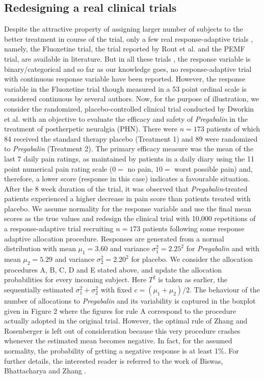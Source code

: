\subsection{Redesigning a real clinical trials}

Despite the attractive property of assigning larger number of subjects
to the better treatment in course of the trial, only a few real response-adaptive trials , namely, the Fluoxetine trial\cite{22}, the trial reported by Rout et al.\cite{78} and  the PEMF trial\cite{79,80},  are available in literature. But in all these trials , the response variable is binary/categorical and so far as our knowledge goes, no response-adaptive trial with continuous response variable have been reported. However, the response variable in the Fluoxetine trial though measured in a 53 point ordinal scale is considered continuous by several authors\cite{58}. Now, for the purpose of illustration, we consider  the randomized, placebo-controlled clinical trial conducted by Dworkin et al.\cite{23} with an objective to evaluate the efficacy and safety of \textit{Pregabalin} in the treatment of postherpetic neuralgia (PHN). There were $n =173$ patients of which 84 received the standard therapy placebo (Treatment 1) and 89 were randomized to \textit{Pregabalin} (Treatment 2). The primary efficacy measure was the mean of the last 7 daily pain ratings, as maintained by patients in a daily diary using the 11 point numerical pain rating scale ($0=$ no pain, $10=$ worst possible pain) and, therefore, a lower score (response in this case) indicates a favourable situation. After the 8 week duration of the trial, it was observed that \textit{Pregabalin}-treated patients experienced a higher decrease in pain score than patients treated with placebo. We assume normality for the response variable and use the final mean scores as the true values  and redesign the clinical trial with 10,000 repetitions of a response-adaptive trial recruiting $n=173$ patients following some response adaptive allocation procedure. Responses are generated from a normal distribution with mean $\mu_{1}=3.60$ and variance $\sigma_{1}^{2} = 2.25^{2}$  for \textit{Pregabalin} and with mean $\mu_{2}=5.29$ and variance $\sigma_{2}^{2} = 2.20^{2}$  for placebo. We consider the  allocation procedures A, B, C, D and E stated above, and update the allocation probabilities for every incoming subject. Here $T^{2}$ is taken as earlier, the sequentially estimated $\sigma_{1}^{2}+\sigma_{2}^{2}$ with fixed $c=(\mu_{1}+\mu_{2})/2$.  The behaviour of the number of allocations to \textit{Pregabalin} and its variability is captured in the boxplot given in Figure 2 where the figures for rule A  correspond to the  procedure actually adopted in the original trial. However, the optimal rule of Zhang and Rosenberger\cite{24} is left out of consideration because this very procedure crashes whenever the estimated mean becomes negative. In fact, for the assumed normality, the probability of getting a negative response is at least 1\%. For further details, the interested reader is referred to the work of Biswas, Bhattacharya and Zhang\cite{42} .
